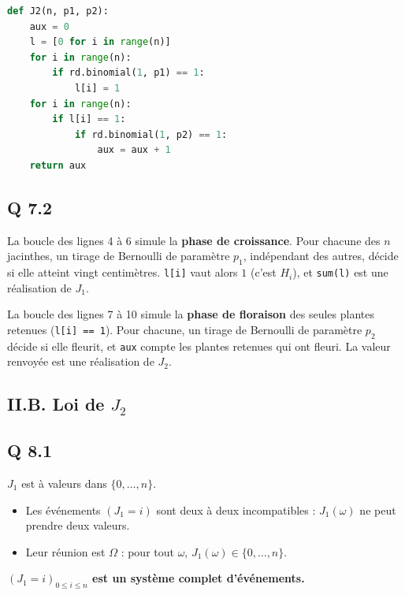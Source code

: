 \documentclass[11pt,a4paper]{article}
\providecommand{\tightlist}{\setlength{\itemsep}{0pt}\setlength{\parskip}{0pt}}
\begin{document}
\begin{lstlisting}[language=Python]
def J2(n, p1, p2):
    aux = 0
    l = [0 for i in range(n)]
    for i in range(n):
        if rd.binomial(1, p1) == 1:
            l[i] = 1
    for i in range(n):
        if l[i] == 1:
            if rd.binomial(1, p2) == 1:
                aux = aux + 1
    return aux
\end{lstlisting}

\hypertarget{q-7.2}{%
\subsection{Q 7.2}\label{q-7.2}}

La boucle des lignes 4 à 6 simule la \textbf{phase de croissance}. Pour chacune des \(n\) jacinthes, un tirage de Bernoulli de paramètre \(p_1\), indépendant des autres, décide si elle atteint vingt centimètres. \texttt{l{[}i{]}} vaut alors \(1\) (c'est \(H_i\)), et \texttt{sum(l)} est une réalisation de \(J_1\).

La boucle des lignes 7 à 10 simule la \textbf{phase de floraison} des seules plantes retenues (\texttt{l{[}i{]}\ ==\ 1}). Pour chacune, un tirage de Bernoulli de paramètre \(p_2\) décide si elle fleurit, et \texttt{aux} compte les plantes retenues qui ont fleuri. La valeur renvoyée est une réalisation de \(J_2\).

\hypertarget{ii.b.-loi-de-j_2}{%
\subsection{\texorpdfstring{II.B. Loi de \(J_2\)}{II.B. Loi de J\_2}}\label{ii.b.-loi-de-j_2}}

\hypertarget{q-8.1}{%
\subsection{Q 8.1}\label{q-8.1}}

\(J_1\) est à valeurs dans \(\{0,\dots,n\}\).

\begin{itemize}
\tightlist
\item
  Les événements \((J_1=i)\) sont deux à deux incompatibles : \(J_1(\omega)\) ne peut prendre deux valeurs.
\item
  Leur réunion est \(\Omega\) : pour tout \(\omega\), \(J_1(\omega)\in\{0,\dots,n\}\).
\end{itemize}

\textbf{\((J_1=i)_{0\le i\le n}\) est un système complet d'événements.}
\end{document}
